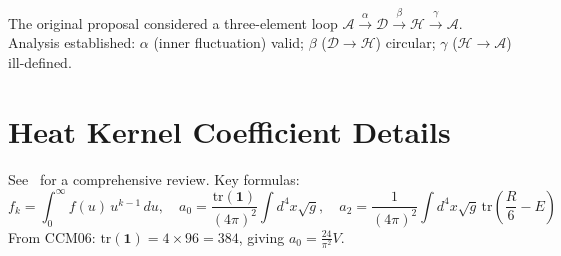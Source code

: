 \documentclass[11pt,a4paper]{article}
\theoremstyle{remark}
\begin{document}
The original proposal considered a three-element loop $\mathcal{A} \xrightarrow{\alpha} \mathcal{D} \xrightarrow{\beta} \mathcal{H} \xrightarrow{\gamma} \mathcal{A}$. Analysis established: $\alpha$ (inner fluctuation) valid; $\beta$ ($\mathcal{D} \to \mathcal{H}$) circular; $\gamma$ ($\mathcal{H} \to \mathcal{A}$) ill-defined.

\section{Heat Kernel Coefficient Details}

See~\cite{Vas03} for a comprehensive review. Key formulas:
\[
  f_k = \int_0^\infty f(u)\, u^{k-1}\, du, \quad a_0 = \frac{\mathrm{tr}(\mathbf{1})}{(4\pi)^2}\int d^4x\sqrt{g}, \quad a_2 = \frac{1}{(4\pi)^2}\int d^4x\sqrt{g}\,\mathrm{tr}\left(\frac{R}{6} - E\right)
\]
From CCM06: $\mathrm{tr}(\mathbf{1}) = 4 \times 96 = 384$, giving $a_0 = \frac{24}{\pi^2} V$.
\end{document}
